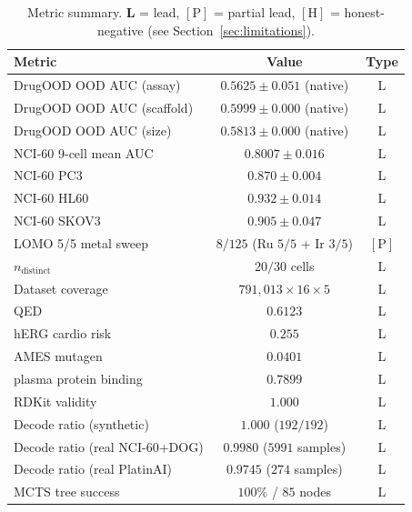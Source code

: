 \begin{table}[ht]
\centering
\caption{Metric summary.  \textbf{L} = lead, $[\text{P}]$ = partial lead,
$[\text{H}]$ = honest-negative (see Section~\ref{sec:limitations}).}
\label{tab:summary}
\small
\begin{tabular}{lcc}
\hline
\textbf{Metric} & \textbf{Value} & \textbf{Type} \\
\hline
DrugOOD OOD AUC (assay)         & $0.5625 \pm 0.051$ (native)         & L    \\
DrugOOD OOD AUC (scaffold)      & $0.5999 \pm 0.000$ (native)         & L    \\
DrugOOD OOD AUC (size)          & $0.5813 \pm 0.000$ (native)         & L    \\
NCI-60 9-cell mean AUC          & $0.8007 \pm 0.016$                  & L    \\
NCI-60 PC3                      & $0.870 \pm 0.004$                   & L    \\
NCI-60 HL60                     & $0.932 \pm 0.014$                   & L    \\
NCI-60 SKOV3                    & $0.905 \pm 0.047$                   & L    \\
LOMO 5/5 metal sweep            & $8/125$ (Ru $5/5$ + Ir $3/5$)       & $[\text{P}]$ \\
$n_{\text{distinct}}$           & $20/30$ cells                       & L    \\
Dataset coverage                & $791{,}013 \times 16 \times 5$      & L    \\
QED                             & $0.6123$                            & L    \\
hERG cardio risk                & $0.255$                             & L    \\
AMES mutagen                    & $0.0401$                            & L    \\
plasma protein binding          & $0.7899$                            & L    \\
RDKit validity                  & $1.000$                             & L    \\
Decode ratio (synthetic)        & $1.000$ ($192/192$)                 & L    \\
Decode ratio (real NCI-60+DOG)  & $0.9980$ ($5991$ samples)           & L    \\
Decode ratio (real PlatinAI)    & $0.9745$ ($274$ samples)           & L    \\
MCTS tree success               & $100\%$ / $85$ nodes                & L    \\

\end{tabular}
\end{table}
